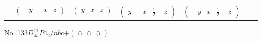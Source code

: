\documentclass[fleqn,9pt,landscape]{jsarticle}
\begin{document}
\begin{center}
\begin{longtable}{ccccccc}
& $ \begin{pmatrix} - y & - x & z \end{pmatrix} $ & $ \begin{pmatrix} y & x & z \end{pmatrix} $ & $ \begin{pmatrix} y & - x & \frac{1}{2} - z \end{pmatrix} $ & $ \begin{pmatrix} - y & x & \frac{1}{2} - z \end{pmatrix} $ & $  $ & $  $ \\
\end{longtable}
\end{center}
\newpage
No. 133\quad$D_{4h}^{11}$\quad$P4_2/nbc$\quad[ tetragonal ]\quad$+\begin{pmatrix} 0 & 0 & 0 \end{pmatrix}$
\end{document}
